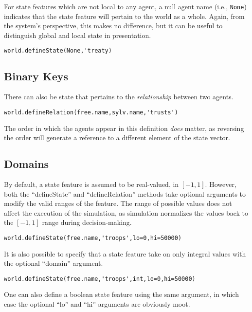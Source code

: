 \documentclass{book}
\begin{document}
For state features which are not local to any agent, a null agent name (i.e., {\tt None}) indicates that the state feature will pertain to the world as a whole. Again, from the system's perspective, this makes no difference, but it can be useful to distinguish global and local state in presentation.

\begin{verbatim}
world.defineState(None,'treaty)
\end{verbatim}

\subsection{Binary Keys}
There can also be state that pertains to the {\em relationship} between two agents. 

\begin{verbatim}
world.defineRelation(free.name,sylv.name,'trusts')
\end{verbatim}

The order in which the agents appear in this definition {\em does} matter, as reversing the order will generate a reference to a different element of the state vector.

\subsection{Domains}
By default, a state feature is assumed to be real-valued, in $[-1,1]$. However, both the ``defineState'' and ``defineRelation'' methods take optional arguments to modify the valid ranges of the feature. The range of possible values does not affect the execution of the simulation, as simulation normalizes the values back to the $[-1,1]$ range during decision-making.

\begin{verbatim}
world.defineState(free.name,'troops',lo=0,hi=50000)
\end{verbatim}

It is also possible to specify that a state feature take on only integral values with the optional ``domain'' argument.

\begin{verbatim}
world.defineState(free.name,'troops',int,lo=0,hi=50000)
\end{verbatim}

One can also define a boolean state feature using the same argument, in which case the optional ``lo'' and ``hi'' arguments are obviously moot.
\end{document}
